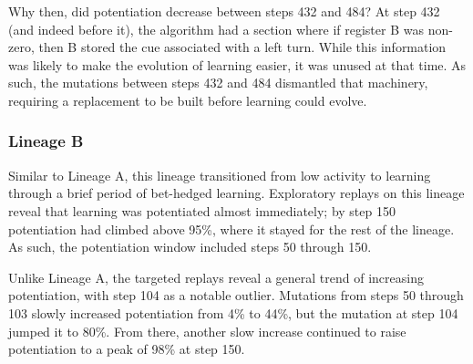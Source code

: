 Why then, did potentiation decrease between steps 432 and 484?
At step 432 (and indeed before it), the algorithm had a section where if register B was non-zero, then B stored the cue associated with a left turn. 
While this information was likely to make the evolution of learning easier, it was unused at that time. 
As such, the mutations between steps 432 and 484 dismantled that machinery, requiring a replacement to be built before learning could evolve.


\subsubsection{Lineage B}


Similar to Lineage A, this lineage transitioned from low activity to learning through a brief period of bet-hedged learning. 
Exploratory replays on this lineage reveal that learning was potentiated almost immediately; by step 150 potentiation had climbed above 95\%, where it stayed for the rest of the lineage. 
As such, the potentiation window included steps 50 through 150.%

Unlike Lineage A, the targeted replays reveal a general trend of increasing potentiation, with step 104 as a notable outlier. 
Mutations from steps 50 through 103 slowly increased potentiation from 4\% to 44\%, but the mutation at step 104 jumped it to 80\%. 
From there, another slow increase continued to raise potentiation to a peak of 98\% at step 150.

